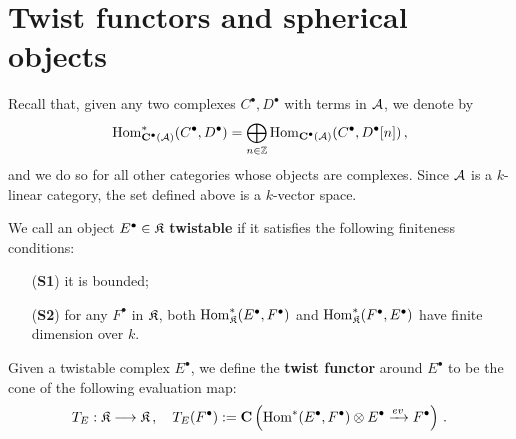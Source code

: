 
\section{Twist functors and spherical objects}

Recall that, given any two complexes $C^{\bullet}, D^{\bullet}$ with terms in $\mathcal{A}$,
we denote by 
	\begin{equation*}
		\operatorname{Hom}_{{\normalfont\textbf{C}}^{\bullet}(\mathcal{A})}^{*}(C^{\bullet},D^{\bullet})
		= \bigoplus_{n \in {\mathbb Z}} \operatorname{Hom}_{{\normalfont\textbf{C}}^{\bullet}(\mathcal{A})}(C^{\bullet},D^{\bullet}[n])\,,
	\end{equation*}
and we do so for all other categories whose objects are complexes.
Since $\mathcal{A}$ is a $k$-linear category, the set defined above is a $k$-vector space.

\begin{df}
	We call an object $E^{\bullet} \in \mathfrak{K}$ \textbf{twistable} if it satisfies
	the following finiteness conditions:
	\begin{itemize}
		\item[(\textbf{S1})]\label{S1} %
		it is bounded;
		
		\item[(\textbf{S2})]\label{S2} for any $F^{\bullet}$ in $\mathfrak{K}$,
		both $\operatorname{Hom}_{\mathfrak{K}}^{*}(E^{\bullet},F^{\bullet})$ and $\operatorname{Hom}_{\mathfrak{K}}^{*}(F^{\bullet},E^{\bullet})$
		have finite dimension over $k$.
	\end{itemize}
\end{df}

\begin{df}
	Given a twistable complex $E^{\bullet}$,
	we define the \textbf{twist functor} around $E^{\bullet}$ 
	to be the cone of the following evaluation map:
	\begin{equation*}
		T_{E} : \mathfrak{K} \longrightarrow \mathfrak{K}\,,
		\quad T_{E}(F^{\bullet}) := 
		{\normalfont\textbf{C}}\left( \operatorname{Hom}^{*}(E^{\bullet},F^{\bullet}) \otimes E^{\bullet} 
		\xrightarrow{ev} F^{\bullet} \right)\,.
	\end{equation*}
\end{df}

